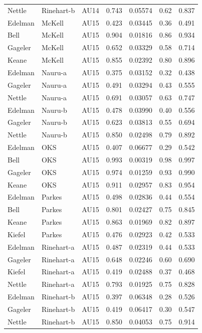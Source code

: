 \documentclass{monashthesis}
\begin{document}
\begin{center}
\begin{longtable}{lllllll}
Nettle & Rinehart-b & AU14 & 0.743 & 0.05574 & 0.62 & 0.837 \\
Edelman & McKell & AU15 & 0.423 & 0.03445 & 0.36 & 0.491 \\
Bell & McKell & AU15 & 0.904 & 0.01816 & 0.86 & 0.934 \\
Gageler & McKell & AU15 & 0.652 & 0.03329 & 0.58 & 0.714 \\
Keane & McKell & AU15 & 0.855 & 0.02392 & 0.80 & 0.896 \\
Edelman & Nauru-a & AU15 & 0.375 & 0.03152 & 0.32 & 0.438 \\
Gageler & Nauru-a & AU15 & 0.491 & 0.03294 & 0.43 & 0.555 \\
Nettle & Nauru-a & AU15 & 0.691 & 0.03057 & 0.63 & 0.747 \\
Edelman & Nauru-b & AU15 & 0.478 & 0.03990 & 0.40 & 0.556 \\
Gageler & Nauru-b & AU15 & 0.623 & 0.03813 & 0.55 & 0.694 \\
Nettle & Nauru-b & AU15 & 0.850 & 0.02498 & 0.79 & 0.892 \\
Edelman & OKS & AU15 & 0.407 & 0.06677 & 0.29 & 0.542 \\
Bell & OKS & AU15 & 0.993 & 0.00319 & 0.98 & 0.997 \\
Gageler & OKS & AU15 & 0.974 & 0.01259 & 0.93 & 0.990 \\
Keane & OKS & AU15 & 0.911 & 0.02957 & 0.83 & 0.954 \\
Edelman & Parkes & AU15 & 0.498 & 0.02836 & 0.44 & 0.554 \\
Bell & Parkes & AU15 & 0.801 & 0.02427 & 0.75 & 0.845 \\
Keane & Parkes & AU15 & 0.863 & 0.01969 & 0.82 & 0.897 \\
Kiefel & Parkes & AU15 & 0.476 & 0.02923 & 0.42 & 0.533 \\
Edelman & Rinehart-a & AU15 & 0.487 & 0.02319 & 0.44 & 0.533 \\
Gageler & Rinehart-a & AU15 & 0.648 & 0.02246 & 0.60 & 0.690 \\
Kiefel & Rinehart-a & AU15 & 0.419 & 0.02488 & 0.37 & 0.468 \\
Nettle & Rinehart-a & AU15 & 0.793 & 0.01925 & 0.75 & 0.828 \\
Edelman & Rinehart-b & AU15 & 0.397 & 0.06348 & 0.28 & 0.526 \\
Gageler & Rinehart-b & AU15 & 0.419 & 0.06417 & 0.30 & 0.547 \\
Nettle & Rinehart-b & AU15 & 0.850 & 0.04053 & 0.75 & 0.914 \\

\end{longtable}
\end{center}
\end{document}
